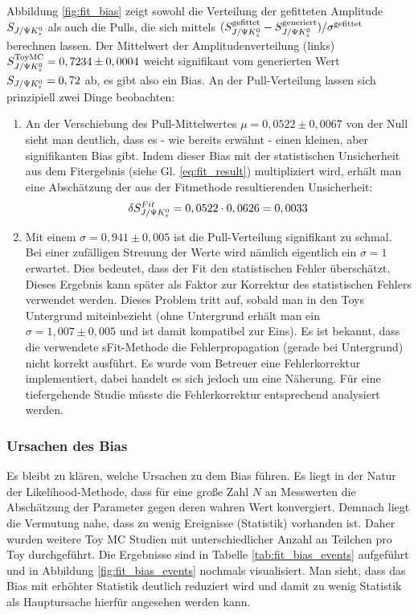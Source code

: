 Abbildung \ref{fig:fit_bias} zeigt sowohl die Verteilung der gefitteten Amplitude $S_{J/\Psi K_s^0}$ als auch die Pulls, die sich mittels $(S_{J/\Psi K_s^0}^{\text{gefittet}} - S_{J/\Psi K_s^0}^{\text{generiert}})/\sigma^{\text{gefittet}}$ berechnen lassen. Der Mittelwert der Amplitudenverteilung (links) $S_{J/\Psi K_s^0}^{\text{ToyMC}} = 0,7234 \pm 0,0004$ weicht signifikant vom generierten Wert $S_{J/\Psi K_s^0} = 0,72$ ab, es gibt also ein Bias. An der Pull-Verteilung lassen sich prinzipiell zwei Dinge beobachten:
\begin{enumerate}
    \item An der Verschiebung des Pull-Mittelwertes $\mu = 0,0522 \pm 0,0067$ von der Null sieht man deutlich, dass es - wie bereits erwähnt - einen kleinen, aber signifikanten Bias gibt. Indem dieser Bias mit der statistischen Unsicherheit aus dem Fitergebnis (siehe Gl. \ref{eq:fit_result}) multipliziert wird, erhält man eine Abschätzung der aus der Fitmethode resultierenden Unsicherheit:
        \begin{align}
        \delta S_{J/\Psi K_s^0}^{Fit} = 0,0522 \cdot 0,0626 = 0,0033
        \end{align}

    \item Mit einem $\sigma = 0,941 \pm 0,005$ ist die Pull-Verteilung signifikant zu schmal. Bei einer zufälligen Streuung der Werte wird nämlich eigentlich ein $\sigma=1$ erwartet. Dies bedeutet, dass der Fit den statistischen Fehler überschätzt. Dieses Ergebnis kann später als Faktor zur Korrektur des statistischen Fehlers verwendet werden. Dieses Problem tritt auf, sobald man in den Toys Untergrund miteinbezieht (ohne Untergrund erhält man ein $\sigma=1,007\pm 0,005$ und ist damit kompatibel zur Eins). Es ist bekannt, dass die verwendete sFit-Methode die Fehlerpropagation (gerade bei Untergrund) nicht korrekt ausführt. Es wurde vom Betreuer eine Fehlerkorrektur implementiert, dabei handelt es sich jedoch um eine Näherung. Für eine tiefergehende Studie müsste die Fehlerkorrektur entsprechend analysiert werden.
\end{enumerate}

\subsubsection{Ursachen des Bias}
Es bleibt zu klären, welche Ursachen zu dem Bias führen. Es liegt in der Natur der Likelihood-Methode, dass für eine große Zahl $N$ an Messwerten die Abschätzung der Parameter gegen deren wahren Wert konvergiert. Demnach liegt die Vermutung nahe, dass zu wenig Ereignisse (\glqq Statistik\grqq) vorhanden ist. Daher wurden weitere Toy MC Studien mit unterschiedlicher Anzahl an Teilchen pro Toy durchgeführt. Die Ergebnisse sind in Tabelle \ref{tab:fit_bias_events} aufgeführt und in Abbildung \ref{fig:fit_bias_events} nochmals visualisiert. Man sieht, dass das Bias mit erhöhter Statistik deutlich reduziert wird und damit zu wenig Statistik als Hauptursache hierfür angesehen werden kann.

